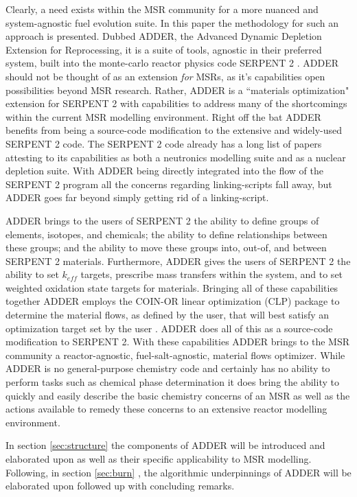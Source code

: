 \documentclass[]{elsarticle}
\begin{document}
Clearly, a need exists within the MSR community for a more nuanced and
system-agnostic fuel evolution suite. In this paper the methodology for such an
approach is presented. Dubbed ADDER, the Advanced Dynamic Depletion
Extension for Reprocessing, it is a suite of tools, agnostic in their
preferred system, built into the monte-carlo reactor physics code SERPENT 2
\cite{leppanen_serpent_nodate}.
ADDER should not be thought of as an extension \textit{for} MSRs, as it's
capabilities open possibilities beyond MSR research. Rather, ADDER is a
``materials optimization" extension for SERPENT 2 with capabilities to address
many of the shortcomings within the current MSR modelling environment. Right off
the bat ADDER benefits from being a source-code modification to the extensive
and widely-used SERPENT 2 code. The SERPENT 2 code already has a long list of
papers attesting to its capabilities as both a neutronics modelling suite and
as a nuclear depletion suite. With ADDER being directly integrated into the
flow of the SERPENT 2 program all the concerns regarding linking-scripts fall
away, but ADDER goes far beyond simply getting rid of a linking-script.

ADDER brings to the users of SERPENT 2 the ability to define groups of elements,
isotopes, and chemicals; the ability to define relationships between these 
groups; and the ability to move these groups into, out-of, and between SERPENT 2
materials. Furthermore, ADDER gives the users of SERPENT 2 the ability to set
$k_{eff}$ targets, prescribe mass transfers within the system, and to set
weighted oxidation state targets for materials. Bringing all of these
capabilities together ADDER employs the COIN-OR linear optimization (CLP) 
package to determine the material flows, as defined by the user, that will best 
satisfy an optimization target set by the user \cite{lougee-heimer_common_2003}.
ADDER does all of this as a source-code
modification to SERPENT 2. With these capabilities ADDER brings to the MSR
community a reactor-agnostic, fuel-salt-agnostic, material flows optimizer.
While ADDER is no general-purpose chemistry code and certainly has no ability
to perform tasks such as chemical phase determination it does bring the ability
to quickly and easily describe the basic chemistry concerns of an MSR as well
as the actions available to remedy these concerns to an extensive reactor
modelling environment. 

In section \ref{sec:structure} the components of ADDER will be introduced and elaborated
upon as well as their specific applicability to MSR modelling. Following, in
section \ref{sec:burn} , the algorithmic underpinnings of ADDER will be 
elaborated upon followed up with concluding remarks.
\end{document}
